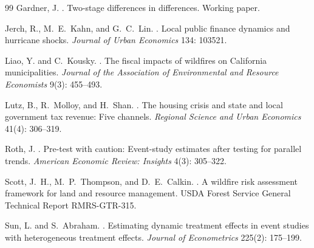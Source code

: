 \documentclass[12pt]{article}
\begin{document}
\begin{thebibliography}{99}
Gardner, J.
.
\newblock Two-stage differences in differences.
\newblock Working paper.

Jerch, R., M.~E.~Kahn, and G.~C.~Lin.
.
\newblock Local public finance dynamics and hurricane shocks.
\newblock \textit{Journal of Urban Economics} 134: 103521.

Liao, Y. and C.~Kousky.
.
\newblock The fiscal impacts of wildfires on California municipalities.
\newblock \textit{Journal of the Association of Environmental and Resource Economists}
  9(3): 455--493.

Lutz, B., R.~Molloy, and H.~Shan.
.
\newblock The housing crisis and state and local government tax revenue: Five channels.
\newblock \textit{Regional Science and Urban Economics} 41(4): 306--319.

Roth, J.
.
\newblock Pre-test with caution: Event-study estimates after testing for parallel trends.
\newblock \textit{American Economic Review: Insights} 4(3): 305--322.

Scott, J.~H., M.~P.~Thompson, and D.~E.~Calkin.
.
\newblock A wildfire risk assessment framework for land and resource management.
\newblock USDA Forest Service General Technical Report RMRS-GTR-315.

Sun, L. and S.~Abraham.
.
\newblock Estimating dynamic treatment effects in event studies with heterogeneous
  treatment effects.
\newblock \textit{Journal of Econometrics} 225(2): 175--199.

\end{thebibliography}

\clearpage

\end{document}
